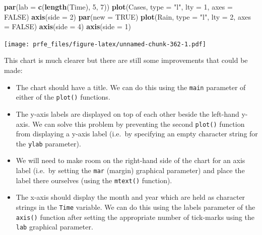\documentclass[12pt,a4paper]{book}
\newenvironment{Shaded}{\begin{snugshade}}{\end{snugshade}}
\newcommand{\DataTypeTok}[1]{\textcolor[rgb]{0.13,0.29,0.53}{#1}}
\newcommand{\DecValTok}[1]{\textcolor[rgb]{0.00,0.00,0.81}{#1}}
\newcommand{\KeywordTok}[1]{\textcolor[rgb]{0.13,0.29,0.53}{\textbf{#1}}}
\newcommand{\NormalTok}[1]{#1}
\newcommand{\OtherTok}[1]{\textcolor[rgb]{0.56,0.35,0.01}{#1}}
\newcommand{\StringTok}[1]{\textcolor[rgb]{0.31,0.60,0.02}{#1}}
\theoremstyle{definition}
\theoremstyle{definition}
\theoremstyle{definition}
\theoremstyle{remark}
\begin{document}
\begin{Shaded}
\begin{Highlighting}[]
\KeywordTok{par}\NormalTok{(}\DataTypeTok{lab =} \KeywordTok{c}\NormalTok{(}\KeywordTok{length}\NormalTok{(Time), }\DecValTok{5}\NormalTok{, }\DecValTok{7}\NormalTok{))}
\KeywordTok{plot}\NormalTok{(Cases, }\DataTypeTok{type =} \StringTok{"l"}\NormalTok{, }\DataTypeTok{lty =} \DecValTok{1}\NormalTok{, }\DataTypeTok{axes =} \OtherTok{FALSE}\NormalTok{)}
\KeywordTok{axis}\NormalTok{(}\DataTypeTok{side =} \DecValTok{2}\NormalTok{)}
\KeywordTok{par}\NormalTok{(}\DataTypeTok{new =} \OtherTok{TRUE}\NormalTok{)}
\KeywordTok{plot}\NormalTok{(Rain, }\DataTypeTok{type =} \StringTok{"l"}\NormalTok{, }\DataTypeTok{lty =} \DecValTok{2}\NormalTok{, }\DataTypeTok{axes =} \OtherTok{FALSE}\NormalTok{)}
\KeywordTok{axis}\NormalTok{(}\DataTypeTok{side =} \DecValTok{4}\NormalTok{)}
\KeywordTok{axis}\NormalTok{(}\DataTypeTok{side =} \DecValTok{1}\NormalTok{)}
\end{Highlighting}
\end{Shaded}

\texttt{[image: prfe\_files/figure-latex/unnamed-chunk-362-1.pdf]}

This chart is much clearer but there are still some improvements that
could be made:

\begin{itemize}
\item
  The chart should have a title. We can do this using the \texttt{main}
  parameter of either of the \texttt{plot()} functions.
\item
  The y-axis labels are displayed on top of each other beside the
  left-hand y-axis. We can solve this problem by preventing the second
  \texttt{plot()} function from displaying a y-axis label (i.e.~by
  specifying an empty character string for the \texttt{ylab} parameter).
\item
  We will need to make room on the right-hand side of the chart for an
  axis label (i.e.~by setting the \texttt{mar} (margin) graphical
  parameter) and place the label there ourselves (using the
  \texttt{mtext()} function).
\item
  The x-axis should display the month and year which are held as
  character strings in the \texttt{Time} variable. We can do this using
  the labels parameter of the \texttt{axis()} function after setting the
  appropriate number of tick-marks using the \texttt{lab} graphical
  parameter.
\end{itemize}
\end{document}
